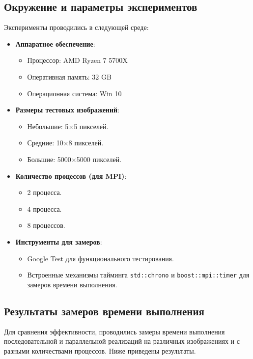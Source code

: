 \documentclass[12pt]{article}
\begin{document}
\subsection{Окружение и параметры экспериментов}
Эксперименты проводились в следующей среде:
\begin{itemize}
    \item \textbf{Аппаратное обеспечение}:
    \begin{itemize}
        \item Процессор: AMD Ryzen 7 5700X
        \item Оперативная память: 32 GB
        \item Операционная система: Win 10
    \end{itemize}
    \item \textbf{Размеры тестовых изображений}:
    \begin{itemize}
        \item Небольшие: 5$\times$5 пикселей.
        \item Средние: 10$\times$8 пикселей.
        \item Большие: 5000$\times$5000 пикселей.
    \end{itemize}
    \item \textbf{Количество процессов (для MPI)}:
    \begin{itemize}
        \item 2 процесса.
        \item 4 процесса.
        \item 8 процессов.
    \end{itemize}
    \item \textbf{Инструменты для замеров}:
    \begin{itemize}
        \item Google Test для функционального тестирования.
        \item Встроенные механизмы тайминга \texttt{std::chrono} и \texttt{boost::mpi::timer} для замеров времени выполнения.
    \end{itemize}
\end{itemize}

\subsection{Результаты замеров времени выполнения}

Для сравнения эффективности, проводились замеры времени выполнения последовательной и параллельной реализаций на различных изображениях и с разными количествами процессов. Ниже приведены результаты.
\end{document}
